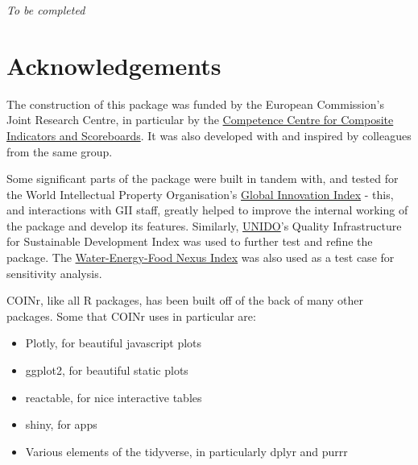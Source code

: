 \documentclass[
]{book}
\providecommand{\tightlist}{%
  \setlength{\itemsep}{0pt}\setlength{\parskip}{0pt}}
\begin{document}
\emph{To be completed}

\hypertarget{acknowledgements}{%
\chapter{Acknowledgements}\label{acknowledgements}}

The construction of this package was funded by the European Commission's Joint Research Centre, in particular by the \href{https://composite-indicators.jrc.ec.europa.eu/}{Competence Centre for Composite Indicators and Scoreboards}. It was also developed with and inspired by colleagues from the same group.

Some significant parts of the package were built in tandem with, and tested for the World Intellectual Property Organisation's \href{https://www.globalinnovationindex.org/Home}{Global Innovation Index} - this, and interactions with GII staff, greatly helped to improve the internal working of the package and develop its features. Similarly, \href{https://www.unido.org/}{UNIDO}'s Quality Infrastructure for Sustainable Development Index was used to further test and refine the package. The \href{https://wefnexusindex.org/}{Water-Energy-Food Nexus Index} was also used as a test case for sensitivity analysis.

COINr, like all R packages, has been built off of the back of many other packages. Some that COINr uses in particular are:

\begin{itemize}
\tightlist
\item
  Plotly, for beautiful javascript plots
\item
  ggplot2, for beautiful static plots
\item
  reactable, for nice interactive tables
\item
  shiny, for apps
\item
  Various elements of the tidyverse, in particularly dplyr and purrr
\end{itemize}

  
\end{document}
